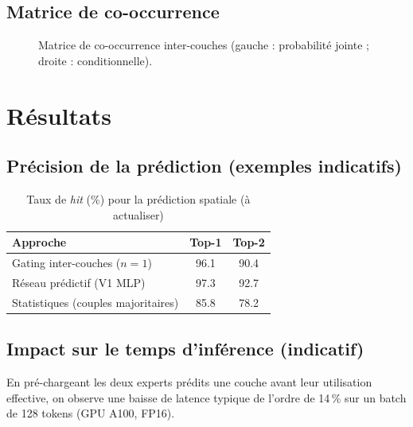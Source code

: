 \documentclass{article}
\begin{document}
\subsection{Matrice de co-occurrence}
\begin{figure}[ht]
  \centering
  \caption{Matrice de co-occurrence inter-couches (gauche : probabilité jointe ; droite : conditionnelle).}
  \label{fig:cooc}
\end{figure}

\section{Résultats}

\subsection{Précision de la prédiction (exemples indicatifs)}
\begin{table}[ht]
  \centering
  \caption{Taux de \emph{hit} (\%) pour la prédiction spatiale (à actualiser)}
  \label{tab:hitrate}
  \begin{tabular}{lcc}
    \toprule
    \textbf{Approche} & \textbf{Top-1} & \textbf{Top-2} \\
    \midrule
    Gating inter-couches ($n{=}1$)      & 96.1 & 90.4 \\
    Réseau prédictif (V1 MLP)           & 97.3 & 92.7 \\
    Statistiques (couples majoritaires) & 85.8 & 78.2 \\
    \bottomrule
  \end{tabular}
\end{table}

\subsection{Impact sur le temps d'inférence (indicatif)}
En pré-chargeant les deux experts prédits une couche avant leur utilisation effective, on observe une baisse de latence typique de l’ordre de 14\,\% sur un batch de 128 tokens (GPU A100, FP16).
\end{document}
